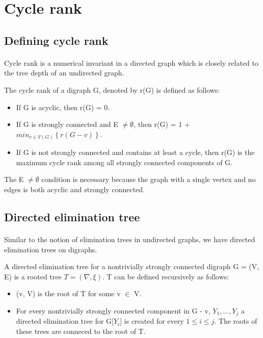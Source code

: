 \section{Cycle rank}

\subsection{Defining cycle rank}

\paragraph{}
Cycle rank is a numerical invariant in a directed graph which is closely related to the tree depth of an undirected graph.
\begin{definition}
The cycle rank of a digraph G, denoted by r(G) is defined as follows:

\begin{itemize}
\item If G is acyclic, then r(G) = 0.
\item If G is strongly connected and E $\neq \emptyset$, then r(G) = 1 + $min_{v \in V(G)} \left\{r(G-v)\right\}$.
\item If G is not strongly connected and contains at least a cycle, then r(G) is the maximum cycle rank among all strongly connected components of G.
\end{itemize}

The E $\neq \emptyset$ condition is necessary because the graph with a single vertex and no edges is both acyclic and strongly connected.

\end{definition}

\subsection{Directed elimination tree}

\paragraph{}
Similar to the notion of elimination trees in undirected graphs, we have directed elimination trees on digraphs.

\begin{definition}

A directed elimination tree for a nontrivially strongly connected digraph G = (V, E) is a rooted tree $T = (\nabla, \xi)$. T can be defined recursively as follows:

\begin{itemize}
\item (v, V) is the root of T for some v $\in$ V.
\item For every nontrivially strongly connected component in G - v, $Y_1, \ldots, Y_j$ a directed elimination tree for G[$Y_i$] is created for every $1 \leq i \leq j$. The roots of these trees are conneced to the root of T.
\end{itemize}
\label{definition:DET}
\end{definition}

